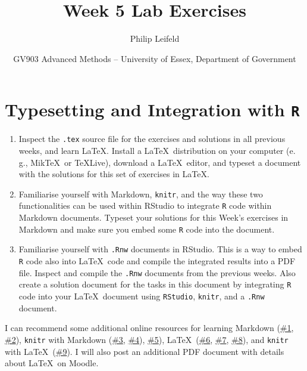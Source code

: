 \documentclass[a4paper,11pt]{article}
\title{Week 5 Lab Exercises}
\author{Philip Leifeld}
\date{GV903 Advanced Methods -- University of Essex, Department of Government}
\begin{document}
\maketitle

\section{Typesetting and Integration with \texttt{R}}

\begin{enumerate}
 \item Inspect the \texttt{.tex} source file for the exercises and solutions in all previous weeks, and learn \LaTeX. Install a \LaTeX\ distribution on your computer (e.\,g., Mik\TeX\ or \TeX Live), download a \LaTeX\ editor, and typeset a document with the solutions for this set of exercises in \LaTeX.
 \item Familiarise yourself with Markdown, \texttt{knitr}, and the way these two functionalities can be used within RStudio to integrate \texttt{R} code within Markdown documents. Typeset your solutions for this Week's exercises in Markdown and make sure you embed some \texttt{R} code into the document.
 \item Familiarise yourself with \texttt{.Rnw} documents in RStudio. This is a way to embed \texttt{R} code also into \LaTeX\ code and compile the integrated results into a PDF file. Inspect and compile the \texttt{.Rnw} documents from the previous weeks. Also create a solution document for the tasks in this document by integrating \texttt{R} code into your \LaTeX\ document using \texttt{RStudio}, \texttt{knitr}, and a \texttt{.Rnw} document.
\end{enumerate}

\noindent I can recommend some additional online resources for learning Markdown (\href{https://www.youtube.com/watch?v=2JE66WFpaII}{\#1}, \href{https://www.youtube.com/watch?v=bpdvNwvEeSE}{\#2}), \texttt{knitr} with Markdown (\href{https://www.youtube.com/watch?v=DUAaNVlC6FE}{\#3}, \href{https://www.youtube.com/watch?v=DNS7i2m4sB0}{\#4}), \href{https://www.youtube.com/watch?v=tKUufzpoHDE}{\#5}), \LaTeX\ (\href{https://www.youtube.com/watch?v=cTEfw-jUqAg}{\#6}, \href{https://www.youtube.com/watch?v=Jp0lPj2-DQA}{\#7}, \href{https://www.youtube.com/watch?v=VhmkLrOjLsw}{\#8}), and \texttt{knitr} with \LaTeX\ (\href{https://www.youtube.com/watch?v=LrWBHqN3TUE}{\#9}). I will also post an additional PDF document with details about \LaTeX\ on Moodle.
\end{document}
